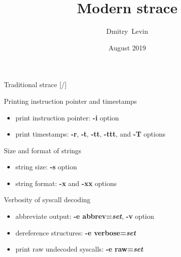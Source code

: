 \documentclass[unicode,aspectratio=169]{beamer}
\title{\Huge Modern strace}
\author{\Huge Dmitry~Levin}
\date{\Large August 2019}
\begin{document}
\begin{frame}
\titlepage
\end{frame}

\begin{frame}{Traditional strace \hfill [\insertframenumber/\inserttotalframenumber]}
\large
\begin{block}{Printing instruction pointer and timestamps}
\begin{itemize}
\item print instruction pointer: \textbf{-i} option
\item print timestamps: \textbf{-r}, \textbf{-t}, \textbf{-tt}, \textbf{-ttt}, and \textbf{-T} options
\end{itemize}
\end{block}

\begin{block}{Size and format of strings}
\begin{itemize}
\item string size: \textbf{-s} option
\item string format: \textbf{-x} and \textbf{-xx} options
\end{itemize}
\end{block}

\begin{block}{Verbosity of syscall decoding}
\begin{itemize}
\item abbreviate output: \textbf{-e abbrev=\textit{set}}, \textbf{-v} option
\item dereference structures: \textbf{-e verbose=\textit{set}}
\item print raw undecoded syscalls: \textbf{-e raw=\textit{set}}
\end{itemize}
\end{block}
\end{frame}
\end{document}
